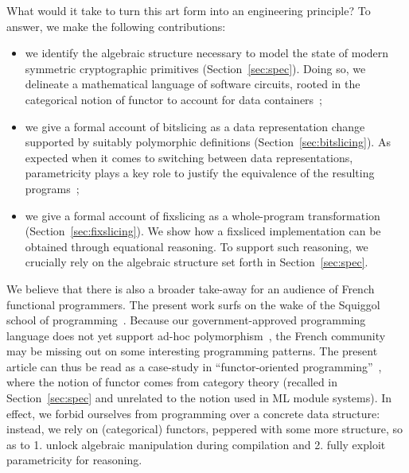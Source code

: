\documentclass[draft,english]{jflart}
\begin{document}

What would it take to turn this art form into an engineering
principle? To answer, we make the following contributions:
%
\begin{itemize}
\item we identify the algebraic structure necessary to model the state
  of modern symmetric cryptographic primitives
  (Section~\ref{sec:spec}). Doing so, we delineate a mathematical
  language of software circuits, rooted in the categorical notion of
  functor to account for data containers~;
\item we give a formal account of bitslicing as a data representation
  change supported by suitably polymorphic definitions
  (Section~\ref{sec:bitslicing}). As expected when it comes to
  switching between data representations, parametricity plays a key
  role to justify the equivalence of the resulting programs~;
\item we give a formal account of fixslicing as a whole-program
  transformation (Section~\ref{sec:fixslicing}). We show how a
  fixsliced implementation can be obtained through equational
  reasoning. To support such reasoning, we crucially rely on the
  algebraic structure set forth in Section~\ref{sec:spec}.
\end{itemize}


We believe that there is also a broader take-away for an audience of
French functional programmers. The present work surfs on
the wake of the Squiggol school of programming~\citep{bird:squiggol}.
Because our government-approved programming language does not yet
support ad-hoc polymorphism~\citep{white:modular-implicit}, the French
community may be missing out on some interesting programming patterns.
The present article can thus be read as a case-study in
``functor-oriented programming''~\citep{roconnor:functor-oriented},
where the notion of functor comes from category theory (recalled in
Section~\ref{sec:spec} and unrelated to the notion used in ML module
systems). In effect, we forbid ourselves from programming over a
concrete data structure: instead, we rely on (categorical) functors,
peppered with some more structure, so as to 1. unlock algebraic
manipulation during compilation and 2. fully exploit parametricity for
reasoning.
\end{document}
